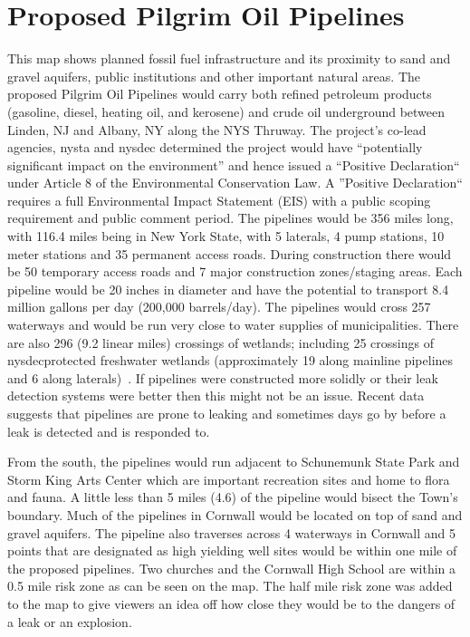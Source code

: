 \section{Proposed Pilgrim Oil Pipelines}\label{subec:pilgrim}

\label{map:proposedoilpipelines}
This map shows planned fossil fuel infrastructure and its proximity to sand and 
gravel aquifers, public institutions and other important natural areas. The 
proposed Pilgrim Oil Pipelines would carry both refined petroleum products 
(gasoline, diesel, heating oil, and kerosene) and crude oil underground between 
Linden, NJ and Albany, NY along the NYS Thruway. The project’s co-lead 
agencies, \gls{nysta} and \gls{nysdec} determined the project would have 
``potentially significant impact on the environment'' and hence issued a 
``Positive Declaration`` under Article 8 of the Environmental Conservation 
Law. A ''Positive Declaration`` requires a full Environmental Impact Statement 
(EIS) with a public scoping requirement and public comment period. The pipelines 
would be 356 miles long, with 116.4 miles being in New York State, with 5 
laterals, 4 pump stations, 10 meter stations and 35 permanent access roads. 
During construction there would be 50 temporary access roads and 7 major 
construction zones/staging areas. Each pipeline would be 20 inches in diameter 
and have the potential to transport 8.4 million gallons per day (200,000 
barrels/day). The pipelines would cross 257 waterways and would be run very 
close to water supplies of municipalities. There are also 296 (9.2 linear miles)
crossings of wetlands; including 25 crossings of \gls{nysdec}protected 
freshwater wetlands (approximately 19 along mainline pipelines and 6 along 
laterals)~\citep{nysdecpilgrim}. If pipelines were constructed more solidly or their leak detection 
systems were better then this might not be an issue. Recent data suggests that 
pipelines are prone to leaking and sometimes days go by before a leak is 
detected and is responded to.

From the south, the pipelines would run adjacent to Schunemunk State Park and 
Storm King Arts Center which are important recreation sites and home to flora 
and fauna. A little less than 5 miles (4.6) of the pipeline would bisect the 
Town’s boundary. Much of the pipelines in Cornwall would be located on top of 
sand and gravel aquifers. The pipeline also traverses across 4 waterways in 
Cornwall and 5 points that are designated as high yielding well sites would be 
within one mile of the proposed pipelines. Two churches and the Cornwall High 
School are within a 0.5 mile risk zone as can be seen on the map. The half mile 
risk zone was added to the map to give viewers an idea off how close they would 
be to the dangers of a leak or an explosion.

